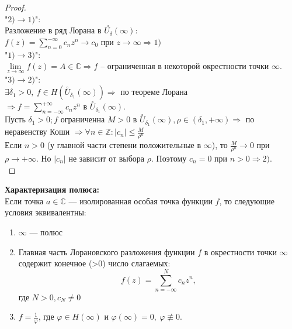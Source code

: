 \begin{proof}
    \ \\
    "$2)\to 1)$":\\
    Разложение в ряд Лорана в $\overset{\circ}{U_{\delta}}(\infty):$\\
    $f(z)=\sum_{n=0}^{-\infty} c_n z^n \to c_0$ при $z\to \infty \Rightarrow 1)$\\[2mm]
    "$1) \to 3)$":\\
    $\lim\limits_{z\to \infty}f(z)=A\in\mathbb{C} \Rightarrow f$ -- ограниченная в некоторой окрестности точки $\infty$.\\[2mm]
    "$3) \to 2) $":\\
    $\exists \delta_1 > 0, \ f\in H(\overset{\circ}{U}_{\delta_1}(\infty)) \Rightarrow$ по теореме Лорана\\
    $\Rightarrow f=\sum_{n=-\infty}^{+\infty}c_n z^n$ в $\overset{\circ}{U}_{\delta_1}(\infty).$\\
    Пусть $\delta_1 > 0; f$ ограниченна $M>0$ в $\overset{\circ}{U}_{\delta_1}(\infty), \rho \in (\delta_1, +\infty)\Rightarrow$ по неравенству Коши $\Rightarrow \forall n\in\mathbb{Z}: |c_n|\leq \frac{M}{\rho^n}$\\
    Если $n > 0$ (у главной части степени положительные в $\infty$), то $\frac{M}{\rho^n} \to 0$ при $\rho \to +\infty$. Но $|c_n|$ не зависит от выбора $\rho$. Поэтому $c_n = 0$ при $n > 0 \Rightarrow 2)$.\\[2mm]
\end{proof}

\textbf{Характеризация полюса:}\\
Если точка $a\in \mathbb{C}$ --- изолированная особая точка функции $f$, то следующие условия эквивалентны:
\begin{enumerate}
    \item $\infty$ --- полюс
    \item Главная часть Лорановского разложения функции $f$ в окрестности точки $\infty$ содержит конечное (>0) число слагаемых:
    $$f(z)=\sum_{n=-\infty}^{N} c_n z^n,$$
    где $N>0, c_{N}\neq 0$ 
    \item $f=\frac{1}{\varphi}$, где $\varphi \in H(\infty)$ и $\varphi(\infty) = 0, \ \varphi \not\equiv 0$.
\end{enumerate}

